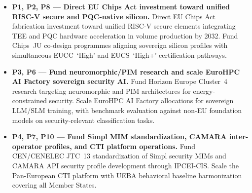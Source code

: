 \documentclass{ieeeaccess}
\begin{document}
\begin{itemize}

    \item \textbf{P1, P2, P8 --- Direct EU Chips Act investment toward
    unified RISC-V secure and PQC-native silicon.}
    Direct EU Chips Act fabrication investment toward unified RISC-V
    secure elements integrating TEE and PQC hardware acceleration in
    volume production by 2032. Fund Chips~JU co-design programmes
    aligning sovereign silicon profiles with simultaneous EUCC~`High'
    and EUCS~`High+' certification pathways.

    \item \textbf{P3, P6 --- Fund neuromorphic/PIM research and scale
    EuroHPC AI Factory sovereign security AI.}
    Fund Horizon Europe Cluster~4 research targeting neuromorphic and
    PIM architectures for energy-constrained security. Scale EuroHPC
    AI Factory allocations for sovereign LLM/SLM training, with
    benchmark evaluation against non-EU foundation models on
    security-relevant classification tasks.

    \item \textbf{P4, P7, P10 --- Fund Simpl MIM standardization,
    CAMARA inter-operator profiles, and CTI platform operations.}
    Fund CEN/CENELEC JTC~13 standardization of Simpl security MIMs
    and CAMARA API security profile development through IPCEI-CIS.
    Scale the Pan-European CTI platform with UEBA behavioral baseline
    harmonization covering all Member States.

\end{itemize}
\end{document}
